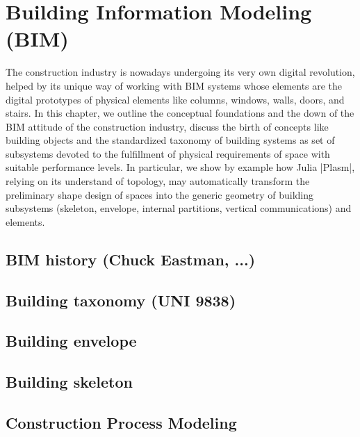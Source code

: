 
\chapter{Building Information Modeling (BIM)}
\label{chapt:9}

The construction industry is nowadays undergoing its very own digital revolution, helped by its unique way of working with BIM systems whose elements are the digital prototypes of physical elements like columns, windows, walls, doors, and stairs. 
In this chapter, we outline the conceptual foundations and the down of the BIM attitude of the construction industry, discuss the birth of concepts like building objects and the standardized taxonomy of building systems as set of subsystems devoted to the fulfillment of physical requirements of space with suitable performance levels. 
In particular, we show  by example how Julia |Plasm|, relying on its understand of topology, may automatically transform the preliminary shape design of spaces into the generic geometry of building subsystems (skeleton, envelope, internal partitions, vertical communications) and elements.


\section{BIM history (Chuck Eastman, ...)}\label{sect:9-1}


\section{Building taxonomy (UNI 9838)}\label{sect:9-2}


\section{Building envelope}\label{sect:9-3}


\section{Building skeleton}\label{sect:9-4}


\section{Construction Process Modeling}\label{sect:9-5}


